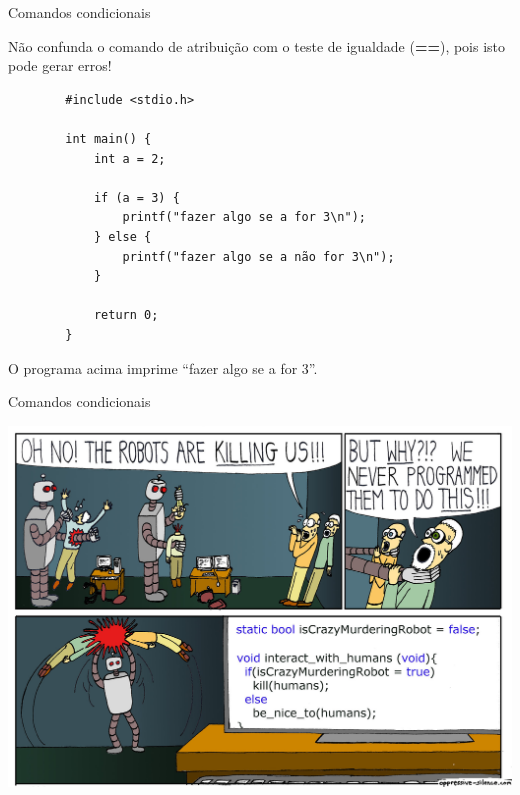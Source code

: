 \documentclass[handout]{beamer}
\begin{document}
\begin{frame}[fragile]{Comandos condicionais}

    Não confunda o comando de atribuição com o teste de igualdade (\textbf{==}), pois isto pode gerar erros!

    \begin{verbatim}
        #include <stdio.h>

        int main() {
            int a = 2;

            if (a = 3) {
                printf("fazer algo se a for 3\n");
            } else {
                printf("fazer algo se a não for 3\n");
            }

            return 0;
        }
    \end{verbatim}

    \pause
    O programa acima imprime ``fazer algo se a for 3''.
\end{frame}

\begin{frame}{Comandos condicionais}
    \begin{center}
        \includegraphics[width=\textwidth]{figs/robotKill.jpg}
    \end{center}
\end{frame}


\end{document}
